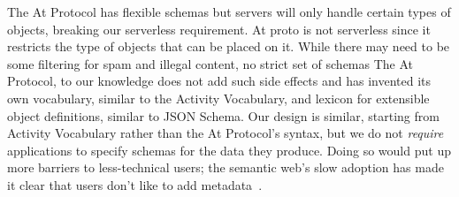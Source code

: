 The At Protocol has flexible schemas but servers will only handle certain types of objects,
breaking our serverless requirement.
At proto is not serverless since it restricts the type of objects that can be placed on it.
While there may need to be some filtering for spam and illegal content, no strict set of schemas
The At Protocol, to our knowledge does not add such side effects and has invented its own vocabulary, similar to the Activity Vocabulary, and lexicon for extensible object definitions, similar to JSON Schema.
Our design is similar, starting from Activity Vocabulary rather than the At Protocol's syntax, but we do not \emph{require} applications to specify schemas for the data they produce. Doing so would put up more barriers to less-technical users; the semantic web's slow adoption has made it clear that users don't like to add metadata~\cite{semanticwebtwodecadeson}.
